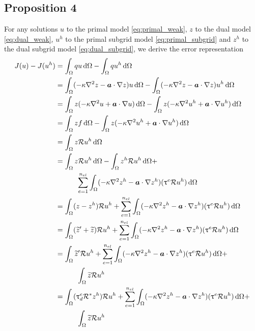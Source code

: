 \subsection{Proposition 4}

For any solutions $u$ to the primal model \eqref{eq:primal_weak},
$z$ to the dual model \eqref{eq:dual_weak}, $u^h$ to the primal
subgrid model \eqref{eq:primal_subgrid} and $z^h$ to the dual
subgrid model \eqref{eq:dual_subgrid}, we derive the error
representation
%
\begin{gather*}
\begin{aligned}
J(u) - J(u^h)
&=
\int_{\Omega} q u \, \text{d} \Omega -
\int_{\Omega} q u^h \, \text{d} \Omega \\
&=
\int_{\Omega} (-\kappa \nabla^2 {z} - \boldsymbol{a} \cdot \nabla {z}) u \, \text{d} \Omega -
\int_{\Omega} (-\kappa \nabla^2 {z} - \boldsymbol{a} \cdot \nabla {z}) u^h \, \text{d} \Omega \\
& =
\int_{\Omega} z (-\kappa \nabla^2 {u} + \boldsymbol{a} \cdot \nabla {u}) \, \text{d} \Omega -
\int_{\Omega} z (-\kappa \nabla^2 {u^h} + \boldsymbol{a} \cdot \nabla {u^h}) \, \text{d} \Omega \\
&=
\int_{\Omega} z f \, \text{d} \Omega -
\int_{\Omega} z (-\kappa \nabla^2 {u^h} + \boldsymbol{a} \cdot \nabla {u^h}) \, \text{d} \Omega \\
&=
\int_{\Omega} z \mathcal{R} u^h \, \text{d} \Omega \\
&=
\int_{\Omega} z \mathcal{R} u^h \, \text{d} \Omega -
\int_{\Omega} z^h \mathcal{R} u^h \, \text{d} \Omega + \\
& \quad \quad \quad \sum_{e=1}^{n_{el}} \int_{\Omega} (-\kappa \nabla^2 {z^h} - \boldsymbol{a} \cdot \nabla {z^h})(\uptau^e \mathcal{R} u^h)
\, \text{d} \Omega \\
&=
\int_{\Omega} (z - z^h) \mathcal{R} u^h +
\sum_{e=1}^{n_{el}} \int_{\Omega} (-\kappa \nabla^2 {z^h} - \boldsymbol{a} \cdot \nabla {z^h})(\uptau^e \mathcal{R} u^h)
\, \text{d} \Omega \\
&=
\int_{\Omega} (\widetilde{z}' + \widetilde{z}) \mathcal{R} u^h +
\sum_{e=1}^{n_{el}} \int_{\Omega} (-\kappa \nabla^2 {z^h} - \boldsymbol{a} \cdot \nabla {z^h})(\uptau^e \mathcal{R} u^h)
\, \text{d} \Omega \\
&=
\int_{\Omega} \widetilde{z}' \mathcal{R} u^h +
\sum_{e=1}^{n_{el}} \int_{\Omega} (-\kappa \nabla^2 {z^h} - \boldsymbol{a} \cdot \nabla {z^h})(\uptau^e \mathcal{R} u^h)
\, \text{d} \Omega + \\
& \quad \quad \quad \int_{\Omega} \widetilde{z} \mathcal{R} u^h \\
&=
\int_{\Omega} (\uptau^e_d \mathcal{R}^* z^h) \mathcal{R} u^h +
\sum_{e=1}^{n_{el}} \int_{\Omega} (-\kappa \nabla^2 {z^h} - \boldsymbol{a} \cdot \nabla {z^h})(\uptau^e \mathcal{R} u^h)
\, \text{d} \Omega + \\
& \quad \quad \quad \int_{\Omega} \widetilde{z} \mathcal{R} u^h
\end{aligned}
\end{gather*}
